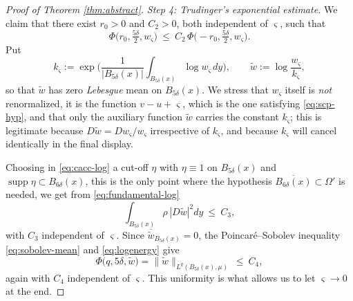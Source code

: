 \documentclass[reqno]{amsart}
\theoremstyle{plain}
\theoremstyle{definition}
\theoremstyle{remark}
\newcommand{\supp}{\operatorname{supp}}
\begin{document}
\begin{proof}[Proof of Theorem \ref{thm:abstract}]
\emph{Step 4: Trudinger's exponential estimate.} We claim that there exist $r_0>0$ and $C_2>0$,
both independent of $\varsigma$, such that
\begin{equation}\label{eq:trudinger}
\Phi\big(r_0,\tfrac{5\delta}{2},w_\varsigma\big)\ \le\ C_2\,\Phi\big(-r_0,\tfrac{5\delta}{2},w_\varsigma\big).
\end{equation}
Put
\[
k_\varsigma:=\exp\Big(\frac{1}{|B_{5\delta}(x)|}\int_{B_{5\delta}(x)}\log w_\varsigma\,dy\Big),
\qquad \widetilde w:=\log\frac{w_\varsigma}{k_\varsigma},
\]
so that $\widetilde w$ has zero \emph{Lebesgue} mean on $B_{5\delta}(x)$. We stress that
$w_\varsigma$ itself is \emph{not} renormalized, it is the function $v-u+\varsigma$, which is the
one satisfying \eqref{eq:scp-hyp}, and that only the auxiliary function $\widetilde w$ carries the
constant $k_\varsigma$; this is legitimate because
$D\widetilde w=Dw_\varsigma/w_\varsigma$ irrespective of $k_\varsigma$, and because $k_\varsigma$
will cancel identically in the final display.

Choosing in \eqref{eq:cacc-log} a cut-off $\eta$ with $\eta\equiv1$ on $B_{5\delta}(x)$ and
$\supp\eta\subset B_{6\delta}(x)$, this is the only point where the hypothesis
$\overline{B_{6\delta}(x)}\subset\Omega'$ is needed, we get from \eqref{eq:fundamental-log}
\begin{equation}\label{eq:logenergy}
\int_{B_{5\delta}(x)}\rho\,|D\widetilde w|^2dy\ \le\ C_3 ,
\end{equation}
with $C_3$ independent of $\varsigma$. Since $\overline{\widetilde w}_{B_{5\delta}(x)}=0$, the
Poincar\'e--Sobolev inequality \eqref{eq:sobolev-mean} and \eqref{eq:logenergy} give
\begin{equation}\label{eq:logLq}
\Phi\big(q,5\delta,\widetilde w\big)=\|\widetilde w\|_{L^{q}(B_{5\delta}(x),\mu)}\ \le\ C_4 ,
\end{equation}
again with $C_4$ independent of $\varsigma$. This uniformity is what allows us to let
$\varsigma\to0$ at the end.


\end{proof}
\end{document}
